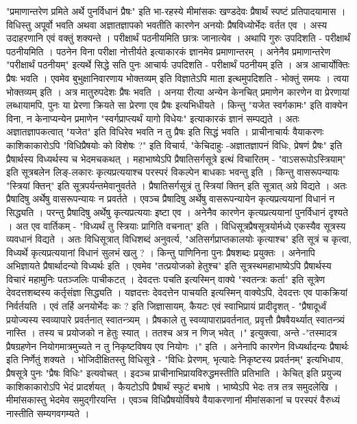 "प्रमाणान्तरेण प्रमिते अर्थे पुनर्विधानं प्रैषः" इति भा-रहस्ये मीमांसकः खण्डदेवः प्रैषार्थं स्पष्टं प्रतिपादयामास । विधिस्तु अपूर्वो भवति अथवा अज्ञातज्ञापको भवतीति कारणेन अनयोः प्रैषविध्योर्भेदः वर्तत एव । अस्य उदाहरणानि एवं वक्तुं शक्यन्ते । परीक्षार्थं पठनीयमिति छात्रः जानात्येव । अथापि गुरुः उपदिशति - परीक्षार्थं पठनीयमिति । पठनेन विना परीक्षा नोत्तीर्यते इत्याकारकं ज्ञानमेव प्रमाणान्तरम् । अनेनैव प्रमाणान्तरेण "परीक्षार्थं पठनीयम्" इत्यर्थे सिद्धे सति पुनः आचार्यः उपदिशति - परीक्षार्थं पठनीयम् इति । अत्र आचार्योक्तिः प्रैषः भवति । एवमेव बुभुक्षानिवारणाय भोक्तव्यम् इति विज्ञातेऽपि माता इत्थमुपदिशति - भोक्तुं समयः । त्वया भोक्तव्यम् इति । अत्र मातुरुपदेशः प्रैषः भवति । अनया रीत्या अन्येन केनचित् प्रमाणेन कारणेन वा  प्रेरणायां लब्धायामपि, पुनः या प्रेरणा क्रियते सा प्रेरणा एव प्रैषः इत्यभिधीयते  । किन्तु "यजेत स्वर्गकामः" इति वाक्येन विना, न केनाप्यन्येन प्रमाणेन "स्वर्गप्राप्त्यर्थं यागो विधेयः" इत्याकारकं ज्ञानं सम्पद्यते । अतः अज्ञातज्ञापकत्वात् "यजेत" इति विधिरेव भवति न तु प्रैषः इति सिद्धं भवति । प्राचीनाचार्यः वैयाकरणः काशिकाकारोऽपि "विधिप्रैषयोः को विशेषः ?" इति विचार्य, "केचिदाहुः -अज्ञातज्ञापनं विधिः, प्रेषणं प्रैषः" इति प्रैषार्थस्य विध्यर्थस्य च भेदमचकथत् । महाभाष्येऽपि प्रैषातिसर्गसूत्रे इत्थं विचारितम् - "वाऽसरूपोऽस्त्रियाम्" इति सूत्रबलेन लिङ्-लकारः कृत्यप्रत्ययाश्च परस्परं विकल्पेन बाधकाः भवन्तु इति । किन्तु वासरूपन्यायः "स्त्रियां क्तिन्" इति सूत्रपर्यन्तमेवानुवर्तते । प्रैषातिसर्गसूत्रं तु स्त्रियां क्तिन् इति सूत्रात् अग्रे विद्यते । अतः प्रैषादिषु अर्थेषु वासरूपन्यायः न प्रवर्तते । एवञ्च प्रैषादिषु अर्थेषु वासरूपन्यायेन कृत्यप्रत्ययानां विधानं न सिद्ध्यति । परन्तु प्रैषादिषु अर्थेषु कृत्यप्रत्ययाः इष्टा एव । अनेनैव कारणेन कृत्यप्रत्ययानां पुनर्विधानं दृश्यते । अत एव वार्तिकम् - "विध्यर्थं तु स्त्रियाः प्रागिति वचनात्" इति । विधिसूत्रप्रैषसूत्रयोर्मध्ये एकस्यैव सूत्रस्य व्यवधानं विद्यते । अतः विधिसूत्रात् विधिशब्दं अनुवर्त्य, "अतिसर्गप्राप्तकालयोः कृत्याश्च" इति सूत्रं च कृत्वा, विध्यर्थे कृत्यप्रत्ययानां विधानं सुलभं खलु ? । किन्तु पाणिनिना पुनः प्रैषशब्दः प्रयुक्तः । अनेनापि अभिज्ञायते प्रैषार्थादन्यो विध्यर्थः इति । एवमेव "तत्प्रयोजको हेतुश्च" इति सूत्रस्थमहाभाष्येऽपि प्रैषार्थस्य विचारं महामुनिः पतञ्जलिः पाचीकटत् ।  देवदत्तः पचति इत्यस्मिन् वाक्ये "स्वतन्त्रः कर्ता" इति सूत्रेण देवदत्तशब्दस्य कर्तृसंज्ञा सिद्ध्यति । यज्ञदत्तः देवदत्तेन पाचयति इत्यस्मिन् वाक्येऽपि, देवदत्तः एव पाकक्रियां निर्वर्तयति । एवं तर्हि अनयोर्भेदः कः ? इति जिज्ञासायम्, कैयटः एवं स्वाभिप्रायं प्रादीदृशत्  - "प्रैषादूर्ध्वं प्रयोज्यस्य स्वव्यापारे प्रवर्तनात् स्वातन्त्र्यम् । प्रैषकाले तु स्वव्यापाराप्रवर्तनात्, प्रवृत्तौ प्रैषवैयर्थ्यात् स्वातन्त्र्यं नास्ति । तस्य च  प्रयोजको न हेतुः स्यात् । ततश्च अत्र न णिज् भवेत् ।" इत्युक्त्वा, अन्ते -"तस्मादत्र प्रैषग्रहणेन नियोगमात्रमुच्यते न तु निकृष्टविषय एव नियोगः ।" इति । अनेनापि कारणेन विध्यर्थादन्यः प्रैषार्थः इति निर्णेतुं शक्यते । भोजिदीक्षितस्तु विधिसूत्रे - "विधिः प्रेरणम्, भृत्यादेः निकृष्टस्य प्रवर्तनम्" इत्यभिधाय, प्रैषसूत्रे पुनः "प्रैषः विधिः" इत्यवोचत् । इदञ्च प्राचीनाभिप्रायविरुद्धमस्तीति प्रतिभाति । केचित् इति प्रयुज्य काशिकाकारोऽपि भेदं प्रादर्शयत् । कैयटोऽपि प्रैषार्थं स्फुटं बभाषे । भाष्येऽपि भेदः तत्र तत्र समुदलेखि । मीमांसकास्तु भेदमेव समुद्गीरयन्ति । एवञ्च विधिप्रैषयोर्विषये  वैयाकरणानां मीमांसकानां च परस्परं वैरुध्यं नास्तीति सम्यगवगम्यते ।

